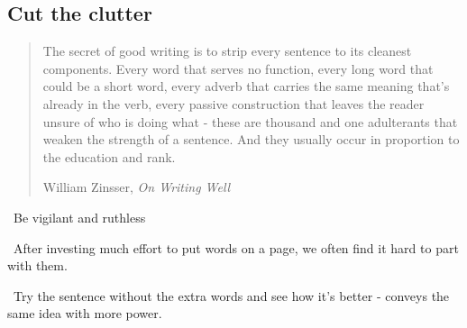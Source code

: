 \documentclass[a4paper, 12pt]{article}
\begin{document}
\newpage\subsection{Cut the clutter}

\begin{quote}
The secret of good writing is to strip every sentence to its cleanest components. 
Every word that serves no function, every long word that could be a short word, 
every adverb that carries the same meaning that's already in the verb, 
every passive construction that leaves the reader unsure of who is doing what
- these are thousand and one adulterants that weaken the strength of a sentence. 
And they usually occur in proportion to the education and rank. 
\begin{flushright}
William Zinsser, \textit{On Writing Well}
\end{flushright}
\end{quote}

\vspace{4pt}\par\textbullet\ Be vigilant and ruthless

\vspace{4pt}\par\textbullet\ After investing much effort to put words on a page, we often find it hard to part with them.

\vspace{4pt}\par\textbullet\ Try the sentence without the extra words and see how it's better - conveys the same idea with more power.
\end{document}
